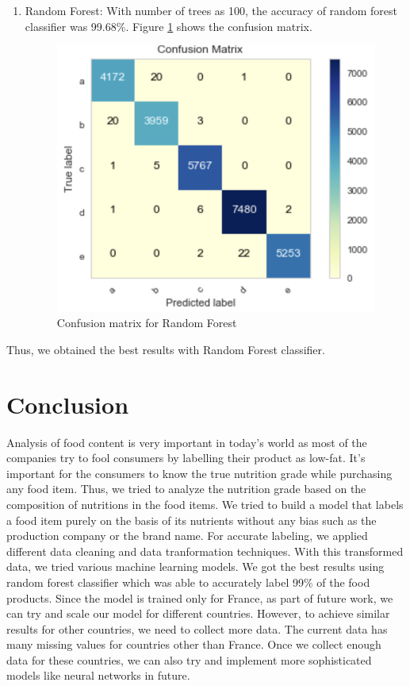 \documentclass[sigconf]{acmart}
\begin{document}
\begin{enumerate}
  \item Random Forest: With number of trees as 100, the accuracy of random forest classifier was 99.68\%. Figure \ref{fig:Fig6} shows the confusion matrix. \\

\begin{figure}
\includegraphics[width=1.0\columnwidth]{images/fig6.png}
\caption{Confusion matrix for Random Forest \cite{code-base}}
\label{fig:Fig6}
\end{figure}

\end{enumerate}

Thus, we obtained the best results with Random Forest classifier.

\section{Conclusion}
Analysis of food content is very important in today's world as most of the companies try to fool consumers by labelling their product as low-fat. It's important for the consumers to know the true nutrition grade while purchasing any food item. Thus, we tried to analyze the nutrition grade based on the composition of nutritions in the food items. We tried to build a model that labels a food item purely on the basis of its nutrients without any bias such as the production company or the brand name. For accurate labeling, we applied different data cleaning and data tranformation techniques. With this transformed data, we tried various machine learning models. We got the best results using random forest classifier which was able to accurately label 99\% of the food products. Since the model is trained only for France, as part of future work, we can try and scale our model for different countries. However, to achieve similar results for other countries, we need to collect more data. The current data has many missing values for countries other than France. Once we collect enough data for these countries, we can also try and implement more sophisticated models like neural networks in future.
\end{document}
